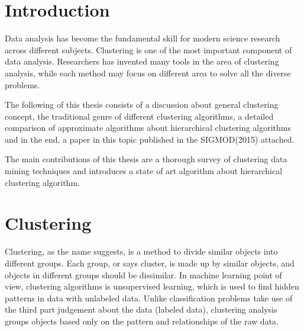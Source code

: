 \documentclass[utf8,english]{gradu3}
\begin{document}
\newtheorem{definition}{Definition}

\mainmatter

\chapter{Introduction}


Data analysis has become the fundamental skill for modern science research across different subjects. Clustering is one of the most important component of data analysis. Researchers has invented many tools in the area of clustering analysis, while each method may focus on different area to solve all the diverse problems. 

The following of this thesis consists of a discussion about general clustering concept, the traditional genre of different clustering algorithms, a detailed comparison of approximate algorithms about hierarchical clustering algorithms and in the end, a paper in this topic  published in the SIGMOD(2015) attached.

The main contributions of this thesis are a thorough survey of clustering data mining techniques 
and introduces a state of art algorithm about hierarchical clustering algorithm.


\chapter{Clustering}


Clustering, as the name suggests, is a method to divide similar objects into different groups. 
Each group, or says cluster, is made up by similar objects, and objects in different groups should be dissimilar. In machine learning point of view, clustering algorithms is unsupervised learning, which is used to find hidden patterns in data with unlabeled data. Unlike classification problems take use of the third part judgement about the data (labeled data), clustering analysis groups objects based only on the pattern and relationships of the raw data. 
\end{document}
